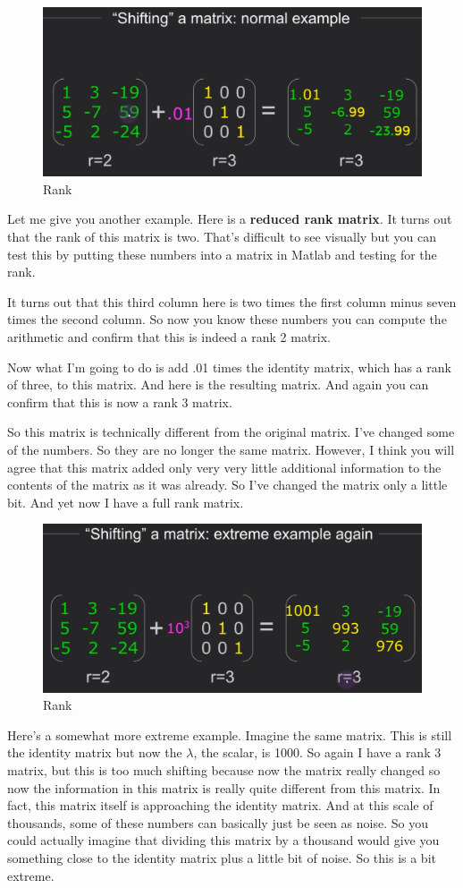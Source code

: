 \documentclass[fleqn,10pt]{olplainarticle}
\theoremstyle{definition}
\theoremstyle{remark}
\begin{document}
\begin{figure}[ht]
	\centering
	\includegraphics[width=0.5\linewidth]{images/rank-31.png}
	\caption{Rank}
	\label{fig:rank_31}
\end{figure}

Let me give you another example. Here is a \textbf{reduced rank matrix}. It turns out that the rank of this matrix is two. That's difficult to see visually but you can test this by putting these numbers into a matrix in Matlab and testing for the rank.

It turns out that this third column here is two times the first column minus seven times the second column. So now you know these numbers you can compute the arithmetic and confirm that this is indeed a rank 2 matrix.

Now what I'm going to do is add .01 times the identity matrix, which has a rank of three, to this matrix. And here is the resulting matrix. And again you can confirm that this is now a rank 3 matrix.

So this matrix is technically different from the original matrix. I've changed some of the numbers. So they are no longer the same matrix. However, I think you will agree that this matrix added only very very little additional information to the contents of the matrix as it was already. So I've changed the matrix only a little bit. And yet now I have a full rank matrix.

\begin{figure}[ht]
	\centering
	\includegraphics[width=0.5\linewidth]{images/rank-32.png}
	\caption{Rank}
	\label{fig:rank_32}
\end{figure}

Here's a somewhat more extreme example. Imagine the same matrix. This is still the identity matrix but now the $\lambda$, the scalar, is 1000. So again I have a rank 3 matrix, but this is too much shifting because now the matrix really changed so now the information in this matrix is really quite different from this matrix. In fact, this matrix itself is approaching the identity matrix. And at this scale of thousands, some of these numbers can basically just be seen as noise. So you could actually imagine that dividing this matrix by a thousand would give you something close to the identity matrix plus a little bit of noise. So this is a bit extreme.
\end{document}
